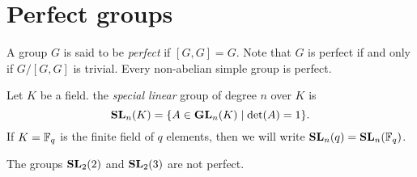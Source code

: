 \section*{Perfect groups}
A group $G$ is said to be {\em perfect} if $[G,G]=G$. Note that
$G$ is perfect if and only if $G/[G,G]$ is trivial. Every non-abelian simple group is perfect.

Let $K$ be a field.  the {\em special linear} group of degree $n$ over $K$ is 
\[ \mathbf{SL}_n(K)=\{ A\in\mathbf{GL}_n(K)\mid \det(A)=1\}.\]
If $K=\mathbb{F}_q$ is the finite field of $q$ elements, then we will write $\mathbf{SL}_n(q)=\mathbf{SL}_n(\mathbb{F}_q)$.

\begin{example}
The groups $\mathbf{SL}_2(2)$ and $\mathbf{SL}_2(3)$ are not perfect. 	
\end{example}

